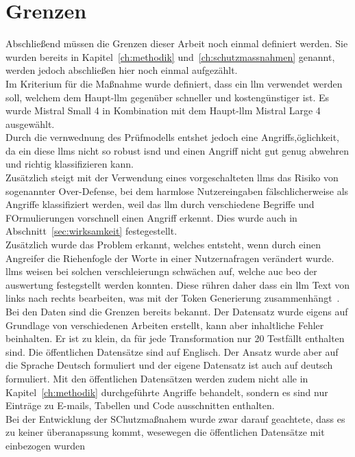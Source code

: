 \section{Grenzen}

Abschließend müssen die Grenzen dieser Arbeit noch einmal definiert werden. Sie wurden bereits in Kapitel~\ref{ch:methodik} und~\ref{ch:schutzmassnahmen} genannt, 
werden jedoch abschließen hier noch einmal aufgezählt. \\
Im Kriterium für die Maßnahme wurde definiert, dass ein \ac{llm} verwendet werden soll, welchem dem Haupt-\ac{llm} gegenüber schneller und kostengünstiger ist.
Es wurde Mistral Small 4 in Kombination mit dem Haupt-\ac{llm} Mistral Large 4 ausgewählt. \\
Durch die vernwednung des Prüfmodells entshet jedoch eine Angriffs,öglichkeit, da ein diese \acp{llm} nicht so robust isnd und einen Angriff nicht gut genug 
abwehren und richtig klassifizieren kann. \\
Zusätzlich steigt mit der Verwendung eines vorgeschalteten \acp{llm} das Risiko von sogenannter Over-Defense, bei dem harmlose Nutzereingaben fälschlicherweise 
als Angriffe klassifiziert werden, weil das \ac{llm} durch verschiedene Begriffe und FOrmulierungen vorschnell einen Angriff erkennt. Dies wurde auch in 
Abschnitt~\ref{sec:wirksamkeit} festegestellt. \\
Zusätzlich wurde das Problem erkannt, welches entsteht, wenn durch einen Angreifer die Riehenfogle der Worte in einer Nutzernafragen verändert wurde. \acp{llm}
weisen bei solchen verschleierungn schwächen auf, welche auc beo der auswertung festegstellt werden konnten. Diese rühren daher dass ein \ac{llm} Text von links
nach rechts bearbeiten, was mit der Token Generierung zusammenhängt~\cite[4]{sm38}. \\
Bei den Daten sind die Grenzen bereits bekannt. Der Datensatz wurde eigens auf Grundlage von verschiedenen Arbeiten erstellt, kann aber inhaltliche Fehler 
beinhalten. Er ist zu klein, da für jede Transformation nur 20 Testfällt enthalten sind. Die öffentlichen Datensätze sind auf Englisch. Der Ansatz wurde aber auf 
die Sprache Deutsch formuliert und der eigene Datensatz ist auch auf deutsch formuliert. Mit den öffentlichen Datensätzen werden zudem nicht alle in 
Kapitel~\ref{ch:methodik} durchgeführte Angriffe behandelt, sondern es sind nur Einträge zu E-mails, Tabellen und Code ausschnitten enthalten. \\
Bei der Entwicklung der SChutzmaßnahem wurde zwar darauf geachtete, dass es zu keiner überanapssung kommt, wesewegen die öffentlichen Datensätze mit einbezogen wurden

